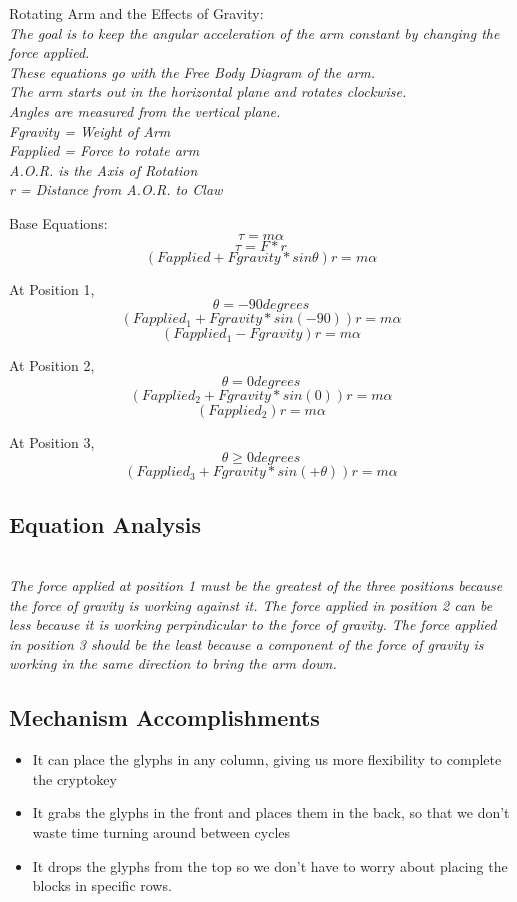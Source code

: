 \vskip 0.25in
Rotating Arm and the Effects of Gravity:
\vskip 0.05in
\textit{
\\The goal is to keep the angular acceleration of the arm constant by changing the force applied. 
\\These equations go with the Free Body Diagram of the arm.
\\The arm starts out in the horizontal plane and rotates clockwise. 
\\Angles are measured from the vertical plane.
}
\vskip 0.1in
\textit{
\\Fgravity = Weight of Arm
\\Fapplied = Force to rotate arm
\\A.O.R. is the Axis of Rotation
\\r = Distance from A.O.R. to Claw
}

\vskip 0.2in
Base Equations:
\[\tau = m\alpha\]
\[\tau = F*r\]
\[(Fapplied + Fgravity*sin\theta)r = m\alpha\]

At Position 1, \[\theta = -90 degrees\]
\[(Fapplied_{1} + Fgravity*sin(-90))r = m\alpha\]
\[(Fapplied_{1} - Fgravity)r = m\alpha\]

At Position 2, \[\theta = 0 degrees\]
\[(Fapplied_{2} + Fgravity*sin(0))r = m\alpha\]
\[(Fapplied_{2})r = m\alpha\]

At Position 3, \[\theta \geq 0 degrees\]
\[(Fapplied_{3} + Fgravity*sin(+\theta))r = m\alpha\]

\subsection*{Equation Analysis}
\textit{
\\The force applied at position 1 must be the greatest of the three positions because the force of gravity is working against it. The force applied in position 2 can be less because it is working perpindicular to the force of gravity. The force applied in position 3 should be the least because a component of the force of gravity is working in the same direction to bring the arm down.
}

\subsection*{Mechanism Accomplishments}
\begin{itemize}
    \item It can place the glyphs in any column, giving us more flexibility to complete the cryptokey
    \item It grabs the glyphs in the front and places them in the back, so that we don't waste time turning around between cycles
    \item It drops the glyphs from the top so we don't have to worry about placing the blocks in specific rows.
\end{itemize} 